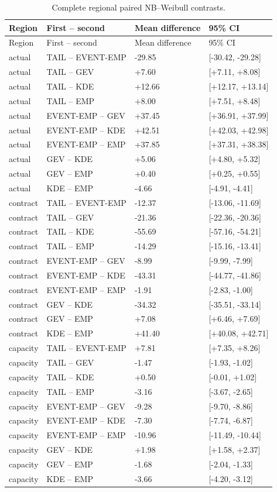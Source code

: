 \begingroup
\fontsize{8.5}{10.5}\selectfont\setlength{\tabcolsep}{3pt}
\begin{longtable}{@{}llll@{}}
\caption{Complete regional paired NB--Weibull contrasts.}\label{tab:final-si-5}\\
\toprule
Region & First -- second & Mean difference & 95\% CI\\\midrule\endfirsthead
Region & First -- second & Mean difference & 95\% CI\\\midrule\endhead
actual & TAIL -- EVENT-EMP & -29.85 & [-30.42, -29.28]\\
actual & TAIL -- GEV & +7.60 & [+7.11, +8.08]\\
actual & TAIL -- KDE & +12.66 & [+12.17, +13.14]\\
actual & TAIL -- EMP & +8.00 & [+7.51, +8.48]\\
actual & EVENT-EMP -- GEV & +37.45 & [+36.91, +37.99]\\
actual & EVENT-EMP -- KDE & +42.51 & [+42.03, +42.98]\\
actual & EVENT-EMP -- EMP & +37.85 & [+37.31, +38.38]\\
actual & GEV -- KDE & +5.06 & [+4.80, +5.32]\\
actual & GEV -- EMP & +0.40 & [+0.25, +0.55]\\
actual & KDE -- EMP & -4.66 & [-4.91, -4.41]\\
contract & TAIL -- EVENT-EMP & -12.37 & [-13.06, -11.69]\\
contract & TAIL -- GEV & -21.36 & [-22.36, -20.36]\\
contract & TAIL -- KDE & -55.69 & [-57.16, -54.21]\\
contract & TAIL -- EMP & -14.29 & [-15.16, -13.41]\\
contract & EVENT-EMP -- GEV & -8.99 & [-9.99, -7.99]\\
contract & EVENT-EMP -- KDE & -43.31 & [-44.77, -41.86]\\
contract & EVENT-EMP -- EMP & -1.91 & [-2.83, -1.00]\\
contract & GEV -- KDE & -34.32 & [-35.51, -33.14]\\
contract & GEV -- EMP & +7.08 & [+6.46, +7.69]\\
contract & KDE -- EMP & +41.40 & [+40.08, +42.71]\\
capacity & TAIL -- EVENT-EMP & +7.81 & [+7.35, +8.26]\\
capacity & TAIL -- GEV & -1.47 & [-1.93, -1.02]\\
capacity & TAIL -- KDE & +0.50 & [-0.01, +1.02]\\
capacity & TAIL -- EMP & -3.16 & [-3.67, -2.65]\\
capacity & EVENT-EMP -- GEV & -9.28 & [-9.70, -8.86]\\
capacity & EVENT-EMP -- KDE & -7.30 & [-7.74, -6.87]\\
capacity & EVENT-EMP -- EMP & -10.96 & [-11.49, -10.44]\\
capacity & GEV -- KDE & +1.98 & [+1.58, +2.37]\\
capacity & GEV -- EMP & -1.68 & [-2.04, -1.33]\\
capacity & KDE -- EMP & -3.66 & [-4.20, -3.12]\\
\bottomrule
\end{longtable}
\endgroup
